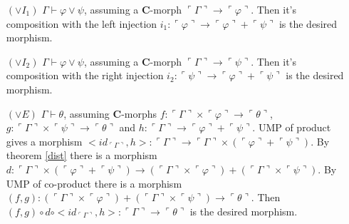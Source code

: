 \documentclass[a4paper,12pt]{paper}
\newcommand{\val}[1]{\ulcorner #1 \urcorner}
\begin{document}
\begin{itemize}
\item[$(\lor I_1)$] $\Gamma \vdash \varphi \lor \psi$, assuming a $\mathbf{C}$-morph $\val \Gamma \longrightarrow \val \varphi$. Then it's composition with the left injection $i_1 : \val \varphi \longrightarrow \val \varphi +‌\val \psi$ is the desired morphism.\\
\item[$(\lor I_2)$] $\Gamma \vdash \varphi \lor \psi$, assuming a $\mathbf{C}$-morph $\val \Gamma \longrightarrow \val \psi$. Then it's composition with the right injection $i_2 : \val \psi \longrightarrow \val \varphi +‌\val \psi$ is the desired morphism.\\
\item[$(\lor E)$] $\Gamma \vdash \theta$, assuming $\mathbf{C}$-morphs $f ‌:\val \Gamma \times \val \varphi \longrightarrow \val \theta$, $g : \val \Gamma \times \val \psi \longrightarrow \val \theta$ and $h : \val \Gamma \longrightarrow \val \varphi + \val \psi$. UMP of product gives a morphism $<id_{\val\Gamma}, h> :‌\val \Gamma \longrightarrow \val \Gamma \times (\val \varphi +‌\val \psi)$. By theorem \ref{dist} there is a morphism $d : \val \Gamma \times (\val \varphi +‌\val \psi) \longrightarrow (\val \Gamma \times \val \varphi) +‌(\val \Gamma \times \val \psi)$. By UMP of co-product there is a morphism $(f, g) :‌(\val \Gamma \times \val \varphi) +‌(\val \Gamma \times \val \psi) \longrightarrow \val \theta$. Then $(f, g) \circ d \circ <id_{\val\Gamma}, h> :‌\val \Gamma \longrightarrow \val \theta$ is the desired morphism.
\end{itemize}
\end{document}
